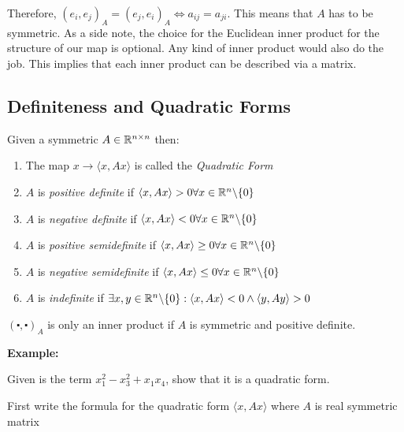Therefore, \((e_i, e_j)_A = (e_j, e_i)_A \iff a_{ij} = a_{ji}\). This means that \(A\) has to be symmetric.
As a side note, the choice for the Euclidean inner product for the structure of our map is optional. Any
kind of inner product would also do the job. This implies that each inner product can be described via a 
matrix.

\subsection{Definiteness and Quadratic Forms}

Given a symmetric \(A \in \mathbb{R}^{n \times n}\) then:

\begin{enumerate}
    
    \item The map \(x \to \langle x, Ax\rangle\) is called the \emph{Quadratic Form}
    
    \item \(A\) is \emph{positive definite} if \(\langle x, Ax \rangle > 0 \forall x \in \mathbb{R}^n 
          \backslash \{0\}\)

    \item \(A\) is \emph{negative definite} if \(\langle x, Ax \rangle < 0 \forall x \in \mathbb{R}^n 
          \backslash \{0\}\)
    
    \item \(A\) is \emph{positive semidefinite} if \(\langle x, Ax \rangle \ge 0 \forall x \in \mathbb{R}^n 
          \backslash \{0\}\)

    \item \(A\) is \emph{negative semidefinite} if \(\langle x, Ax \rangle \le 0 \forall x \in \mathbb{R}^n 
          \backslash \{0\}\)

    \item \(A\) is \emph{indefinite} if \(\exists x,y \in \mathbb{R}^n  \backslash \{0\}: \langle x, Ax\rangle 
          < 0 \land \langle y, Ay \rangle > 0 \)
    
\end{enumerate}

\((\centerdot , \centerdot)_A\) is only an inner product if \(A\) is symmetric and positive definite.

\textbf{Example:}

Given is the term \(x_{1}^{2} - x_{3}^{2} + x_1 x_4\), show that it is a quadratic form.

First write the formula for the quadratic form \(\langle x, Ax\rangle\) where \(A\) is real symmetric 
matrix

